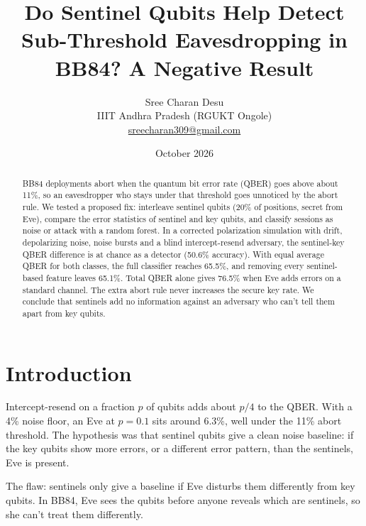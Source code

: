 \documentclass[11pt]{article}
\title{\textbf{Do Sentinel Qubits Help Detect Sub-Threshold Eavesdropping in BB84? A Negative Result}}
\author{Sree Charan Desu\\IIIT Andhra Pradesh (RGUKT Ongole)\\\href{mailto:sreecharan309@gmail.com}{sreecharan309@gmail.com}}
\date{October 2026}
\begin{document}
\maketitle
\noindent{}

\begin{abstract}
BB84 deployments abort when the quantum bit error rate (QBER) goes above about 11\%, so an eavesdropper who stays under that threshold goes unnoticed by the abort rule. We tested a proposed fix: interleave sentinel qubits (20\% of positions, secret from Eve), compare the error statistics of sentinel and key qubits, and classify sessions as noise or attack with a random forest. In a corrected polarization simulation with drift, depolarizing noise, noise bursts and a blind intercept-resend adversary, the sentinel-key QBER difference is at chance as a detector (50.6\% accuracy). With equal average QBER for both classes, the full classifier reaches 65.5\%, and removing every sentinel-based feature leaves 65.1\%. Total QBER alone gives 76.5\% when Eve adds errors on a standard channel. The extra abort rule never increases the secure key rate. We conclude that sentinels add no information against an adversary who can't tell them apart from key qubits.
\end{abstract}

\section{Introduction}
Intercept-resend on a fraction $p$ of qubits adds about $p/4$ to the QBER. With a 4\% noise floor, an Eve at $p=0.1$ sits around 6.3\%, well under the 11\% abort threshold. The hypothesis was that sentinel qubits give a clean noise baseline: if the key qubits show more errors, or a different error pattern, than the sentinels, Eve is present.

The flaw: sentinels only give a baseline if Eve disturbs them differently from key qubits. In BB84, Eve sees the qubits before anyone reveals which are sentinels, so she can't treat them differently.
\end{document}
